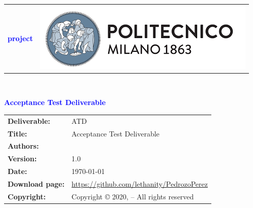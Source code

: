 




\begin{titlepage}



{\begin{table}[t!]
\centering
\begin{tabu} to \textwidth { X[1.3,r,p] X[1.7,l,p] }
\textcolor{Blue}
{\textbf{\small{\projectName{} project \newline \names{}}}} & \includegraphics[scale=0.5]{Images/PolimiLogo}
\end{tabu}
\end{table}}~\\ [7cm]


\begin{flushleft}

{\textcolor{Blue}{\textbf{\Huge{Acceptance Test Deliverable}}}} \\ [1cm]

\end{flushleft}

\end{titlepage}

\begin{table}[h!]
\begin{tabu} to \textwidth { X[0.3,r,p] X[0.7,l,p] }
\hline

\textbf{Deliverable:} & ATD\\
\textbf{Title:} & Acceptance Test Deliverable \\
\textbf{Authors:} & \names{} \\
\textbf{Version:} & 1.0 \\ 
\textbf{Date:} & \today \\
\textbf{Download page:} & \url{https://github.com/lethanity/PedrozoPerez} \\
\textbf{Copyright:} & Copyright © 2020, \names{}  – All rights reserved \\
\hline
\end{tabu}
\end{table}




